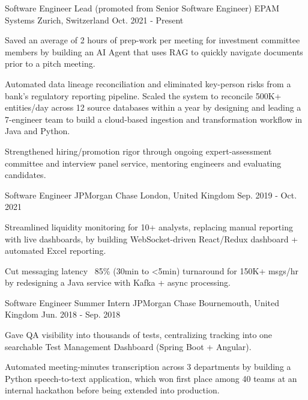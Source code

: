 

\begin{cventries}

  \cventry
    {Software Engineer Lead (promoted from Senior Software Engineer)}
    {EPAM Systems}
    {Zurich, Switzerland}
    {Oct. 2021 - Present}
    {
      \begin{cvitems}
        \item {Saved an average of 2 hours of prep-work per meeting for investment committee members by building an AI Agent that uses RAG to quickly navigate documents prior to a pitch meeting.}
        \item {Automated data lineage reconciliation and eliminated key-person risks from a bank's regulatory reporting pipeline. Scaled the system to reconcile 500K+ entities/day across 12 source databases within a year by designing and leading a 7-engineer team to build a cloud-based ingestion and transformation workflow in Java and Python.}
        \item {Strengthened hiring/promotion rigor through ongoing expert-assessment committee and interview panel service, mentoring engineers and evaluating candidates.}
      \end{cvitems}
    }

  \cventry
    {Software Engineer}
    {JPMorgan Chase}
    {London, United Kingdom}
    {Sep. 2019 - Oct. 2021}
    {
      \begin{cvitems}
        \item {Streamlined liquidity monitoring for 10+ analysts, replacing manual reporting with live dashboards, by building WebSocket-driven React/Redux dashboard + automated Excel reporting.}
        \item {Cut messaging latency ~85\% (30min to <5min) turnaround for 150K+ msgs/hr by redesigning a Java service with Kafka + async processing.}
      \end{cvitems}
    }

  \cventry
    {Software Engineer Summer Intern}
    {JPMorgan Chase}
    {Bournemouth, United Kingdom}
    {Jun. 2018 - Sep. 2018}
    {
      \begin{cvitems}
        \item {Gave QA visibility into thousands of tests, centralizing tracking into one searchable Test Management Dashboard (Spring Boot + Angular).}
        \item {Automated meeting-minutes transcription across 3 departments by building a Python speech-to-text application, which won first place among 40 teams at an internal hackathon before being extended into production.}
      \end{cvitems}
    }

\end{cventries}
